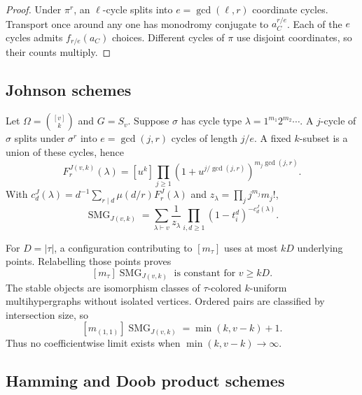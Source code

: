 \documentclass[10pt]{article}
\newcommand{\SMG}{\operatorname{SMG}}
\newcommand{\MGF}{\SMG}
\begin{document}
\begin{proof}
Under $\pi^r$, an $\ell$-cycle splits into $e=\gcd(\ell,r)$ coordinate
cycles.  Transport once around any one has monodromy conjugate to
$a_C^{r/e}$.  Each of the $e$ cycles admits $f_{r/e}(a_C)$ choices.  Different
cycles of $\pi$ use disjoint coordinates, so their counts multiply.
\end{proof}

\subsection{Johnson schemes}

Let $\Omega=\binom{[v]}k$ and $G=S_v$.  Suppose $\sigma$ has cycle type
$\lambda=1^{m_1}2^{m_2}\cdots$.  A $j$-cycle of $\sigma$ splits under
$\sigma^r$ into $e=\gcd(j,r)$ cycles of length $j/e$.  A fixed $k$-subset is
a union of these cycles, hence
\begin{equation}\label{nd:association_schemes:eq:johnson-fixed}
 \boxed{F_r^{J(v,k)}(\lambda)=[u^k]\prod_{j\geq1}
 \left(1+u^{j/\gcd(j,r)}\right)^{m_j\gcd(j,r)}.}
\end{equation}
With $c_d^J(\lambda)=d^{-1}\sum_{r\mid d}\mu(d/r)F_r^J(\lambda)$ and
$z_\lambda=\prod_jj^{m_j}m_j!$,
\begin{equation}\label{nd:association_schemes:eq:johnson-smg}
 \boxed{\MGF_{J(v,k)}=\sum_{\lambda\vdash v}\frac1{z_\lambda}
 \prod_{i,d\geq1}(1-t_i^d)^{-c_d^J(\lambda)}.}
\end{equation}

For $D=|\tau|$, a configuration contributing to $[m_\tau]$ uses at most
$kD$ underlying points.  Relabelling those points proves
\begin{equation}\label{nd:association_schemes:eq:johnson-stable}
 [m_\tau]\MGF_{J(v,k)}\text{ is constant for }v\geq kD.
\end{equation}
The stable objects are isomorphism classes of $\tau$-colored $k$-uniform
multihypergraphs without isolated vertices.  Ordered pairs are classified by
intersection size, so
\begin{equation}\label{nd:association_schemes:eq:johnson-pair}
 \boxed{[m_{(1,1)}]\MGF_{J(v,k)}=\min(k,v-k)+1.}
\end{equation}
Thus no coefficientwise limit exists when $\min(k,v-k)\to\infty$.

\subsection{Hamming and Doob product schemes}
\end{document}
